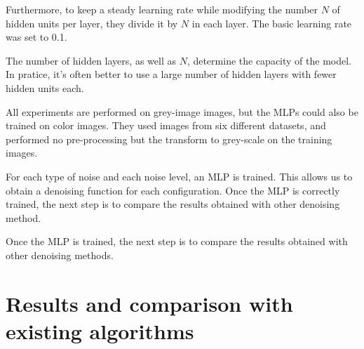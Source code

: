 \documentclass[10pt,a4paper]{article}
\newcommand{\svs}{\vspace{9pt}}
\begin{document}
\svs

Furthermore, to keep a steady learning rate while modifying the number $N$ of hidden units per layer, they divide it by $N$ in each layer. The basic learning rate was set to 0.1. 

\svs

The number of hidden layers, as well as $N$, determine the capacity of the model. In pratice, it's often better to use a large number of hidden layers with fewer hidden units each.

\svs

All experiments are performed on grey-image images, but the MLPs could also be trained on color images. They used images from six different datasets, and performed no pre-processing but the transform to grey-scale on the training images. 

\svs 

For each type of noise and each noise level, an MLP is trained. This allows us to obtain a
denoising function for each configuration.
Once the MLP is correctly trained, the next step is to compare the results obtained with other
denoising method.

Once the MLP is trained, the next step is to compare the results obtained with other denoising methods.





\svs

\section{Results and comparison with existing algorithms}

\end{document}
